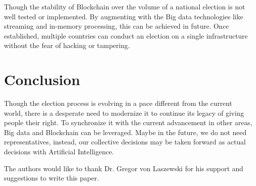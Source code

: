 \documentclass[sigconf]{acmart}
\begin{document}
Though the stability of Blockchain over the volume of a national election is not well tested or implemented. By augmenting with the Big data technologies like streaming and in-memory processing, this can be achieved in future. Once established, multiple countries can conduct an election on a single infrastructure without the fear of hacking or tampering.

\section{Conclusion}
Though the election process is evolving in a pace different from the current world, there is a desperate need to modernize it to continue its legacy of giving people their right. To synchronize it with the current advancement in other areas, Big data and Blockchain can be leveraged.
Maybe in the future, we do not need representatives, instead, our collective decisions may be taken forward as actual decisions with Artificial Intelligence.

\begin{acks}

  The authors would like to thank Dr. Gregor von Laszewski for his
  support and suggestions to write this paper.
\end{acks}


 


\end{document}
